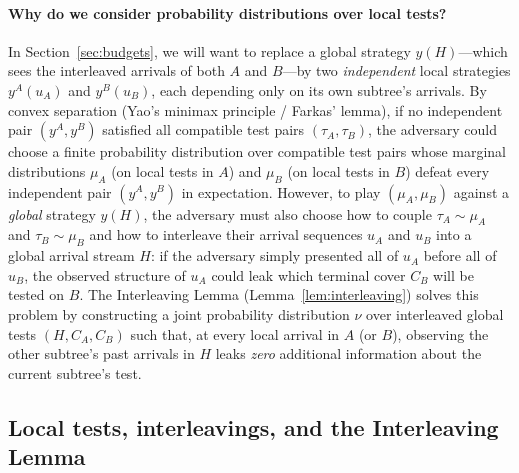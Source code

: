 \documentclass[11pt,letterpaper]{article}
\begin{document}
\paragraph{Why do we consider probability distributions over local tests?}
In Section~\ref{sec:budgets}, we will want to replace a global strategy $y(H)$---which sees the interleaved arrivals of both $A$ and $B$---by two \emph{independent} local strategies $y^A(u_A)$ and $y^B(u_B)$, each depending only on its own subtree's arrivals. By convex separation (Yao's minimax principle / Farkas' lemma), if no independent pair $(y^A,y^B)$ satisfied all compatible test pairs $(\tau_A,\tau_B)$, the adversary could choose a finite probability distribution over compatible test pairs whose marginal distributions $\mu_A$ (on local tests in $A$) and $\mu_B$ (on local tests in $B$) defeat every independent pair $(y^A,y^B)$ in expectation. However, to play $(\mu_A,\mu_B)$ against a \emph{global} strategy $y(H)$, the adversary must also choose how to couple $\tau_A\sim\mu_A$ and $\tau_B\sim\mu_B$ and how to interleave their arrival sequences $u_A$ and $u_B$ into a global arrival stream $H$: if the adversary simply presented all of $u_A$ before all of $u_B$, the observed structure of $u_A$ could leak which terminal cover $C_B$ will be tested on $B$. The Interleaving Lemma (Lemma~\ref{lem:interleaving}) solves this problem by constructing a joint probability distribution $\nu$ over interleaved global tests $(H,C_A,C_B)$ such that, at every local arrival in $A$ (or $B$), observing the other subtree's past arrivals in $H$ leaks \emph{zero} additional information about the current subtree's test.

\subsection{Local tests, interleavings, and the Interleaving Lemma}
\end{document}
